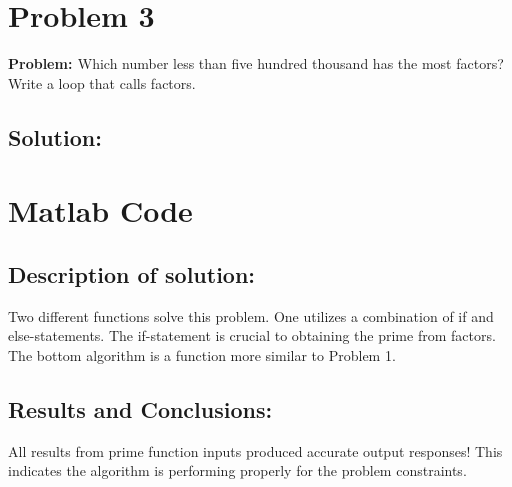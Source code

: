 \documentclass[12pt]{article} %
\begin{document}
\hfill
\newpage

\section {Problem 3}
{\bf{Problem: }}
Which number less than five hundred thousand has the most factors? Write a loop that calls factors.

\subsection{Solution:}



\section*{Matlab Code}




%

\subsection{Description of solution:}
Two different functions solve this problem.  One utilizes a combination of if and else-statements.  The if-statement is crucial to obtaining the prime from factors. 
The bottom algorithm is a function more similar to Problem 1.

\subsection{Results and Conclusions:}
All results from prime function inputs produced accurate output responses! This indicates the algorithm is performing properly for the problem constraints.
\end{document}
